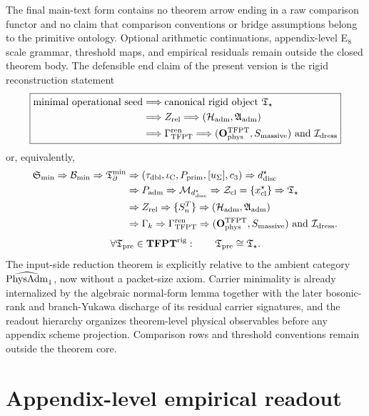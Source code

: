 The final main-text form contains no theorem arrow ending in a raw comparison functor and no claim
that comparison conventions or bridge assumptions belong to the primitive ontology. Optional
arithmetic continuations, appendix-level E$_8$ scale grammar, threshold maps, and empirical
residuals remain outside the closed theorem body. The defensible end claim of the present version
is the rigid reconstruction statement
\[
\boxed{
\begin{aligned}
\text{minimal operational seed}
&\Longrightarrow \text{canonical rigid object }\mathfrak T_{\star}\\
&\Longrightarrow Z_{\mathrm{rel}}
\Longrightarrow (\mathcal H_{\mathrm{adm}},\mathfrak A_{\mathrm{adm}})\\
&\Longrightarrow \Gamma_{\mathrm{TFPT}}^{\mathrm{ren}}
\Longrightarrow (\mathbf O_{\mathrm{phys}}^{\mathrm{TFPT}},S_{\mathrm{massive}})
\ \text{and}\ \mathcal I_{\mathrm{dress}}
\end{aligned}}
\]
or, equivalently,
\[
\begin{aligned}
\mathfrak S_{\min}
\Rightarrow
\mathcal B_{\min}
\Rightarrow
\mathfrak T_{\partial}^{\min}
&\Rightarrow
(\tau_{\mathrm{dbl}},\iota_{\mathrm C},P_{\mathrm{prim}},[u_\Sigma],c_3)
\Rightarrow
d^\star_{\mathrm{disc}}\\
&\Rightarrow
P_{\mathrm{adm}}
\Rightarrow
\mathcal M_{d^\star_{\mathrm{disc}}}
\Rightarrow
\mathcal Z_{\mathrm{cl}}=\{x^\star_{\mathrm{cl}}\}
\Rightarrow
\mathfrak T_{\star}\\
&\Rightarrow
Z_{\mathrm{rel}}
\Rightarrow
\{S_n^T\}
\Rightarrow
(\mathcal H_{\mathrm{adm}},\mathfrak A_{\mathrm{adm}})\\
&\Rightarrow
\Gamma_k
\Rightarrow
\Gamma_{\mathrm{TFPT}}^{\mathrm{ren}}
\Rightarrow
(\mathbf O_{\mathrm{phys}}^{\mathrm{TFPT}},S_{\mathrm{massive}})
\ \text{and}\ \mathcal I_{\mathrm{dress}}.
\end{aligned}
\]
\[
\forall \mathfrak T_{\mathrm{pre}}\in\mathbf{TFPT}^{\mathrm{rig}}:\qquad
\mathfrak T_{\mathrm{pre}}\cong \mathfrak T_{\star}.
\]
The input-side reduction theorem is explicitly relative to the ambient category
$\widehat{\mathrm{PhysAdm}}_1$, now without a packet-size axiom. Carrier minimality is already internalized by
the algebraic normal-form lemma together with the later bosonic-rank and branch-Yukawa discharge of
its residual carrier signatures, and
the readout hierarchy organizes theorem-level physical observables before any appendix scheme
projection. Comparison rows and threshold conventions remain outside the theorem core.

\appendix

\section{Appendix-level empirical readout}
\label{sec:appendix-empirical-readout}
\label{app:comparison}


